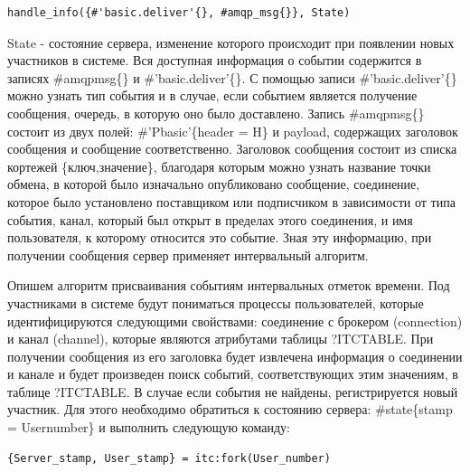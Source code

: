 \begin{lstlisting}
handle_info({#'basic.deliver'{}, #amqp_msg{}}, State)
\end{lstlisting}
State - состояние сервера, изменение которого происходит при появлении новых участников в системе. Вся доступная информация о событии содержится в записях \#amqp\underline{\hspace{0.25cm}}msg\{\} и \#'basic.deliver'\{\}.  С помощью записи \#'basic.deliver'\{\} можно узнать тип события и в случае, если событием является получение сообщения, очередь, в которую оно было доставлено. Запись \#amqp\underline{\hspace{0.25cm}}msg\{\} состоит из двух полей: \#'P\underline{\hspace{0.25cm}}basic'\{header = H\} и payload, содержащих заголовок сообщения и сообщение соответственно. Заголовок сообщения состоит из списка кортежей \{ключ,значение\}, благодаря которым можно узнать название точки обмена, в которой было изначально опубликовано сообщение, соединение, которое было установлено поставщиком или подписчиком в зависимости от типа события, канал, который был открыт в пределах этого соединения, и имя пользователя, к которому относится это событие. Зная эту информацию, при получении сообщения сервер применяет интервальный алгоритм.\par 
Опишем алгоритм присваивания событиям интервальных отметок времени. Под участниками в системе будут пониматься процессы пользователей, которые идентифицируются следующими свойствами: соединение с брокером (connection) и канал (channel), которые являются атрибутами таблицы ?ITC\underline{\hspace{0.25cm}}TABLE. При получении сообщения из его заголовка будет извлечена информация о соединении и канале и будет произведен поиск событий, соответствующих этим значениям, в таблице ?ITC\underline{\hspace{0.25cm}}TABLE. В случае если события не найдены, регистрируется новый участник. Для этого необходимо обратиться к состоянию сервера: \#state\{stamp = User\underline{\hspace{0.25cm}}number\} и выполнить следующую команду:
\begin{lstlisting}
{Server_stamp, User_stamp} = itc:fork(User_number)
\end{lstlisting}
